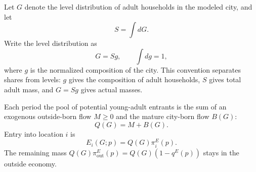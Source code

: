 \documentclass[11pt]{article}
\begin{document}
Let $G$ denote the level distribution of adult households in the modeled city, and let
\begin{equation*}
    S=\int dG.
\end{equation*}
Write the level distribution as
\begin{equation*}
    G=Sg,
    \qquad
    \int dg=1,
\end{equation*}
where $g$ is the normalized composition of the city. This convention separates shares from levels: $g$ gives the composition of adult households, $S$ gives total adult mass, and $G=Sg$ gives actual masses.

Each period the pool of potential young-adult entrants is the sum of an exogenous outside-born flow $M\geq0$ and the mature city-born flow $B(G)$:
\begin{equation}
    Q(G)=M+B(G).
    \label{eq:potential_entry_pool}
\end{equation}
Entry into location $i$ is
\begin{equation}
    E_i(G;p)=Q(G)\pi_i^E(p).
    \label{eq:entry_mass}
\end{equation}
The remaining mass $Q(G)\pi_{\mathrm{out}}^E(p)=Q(G)(1-q^E(p))$ stays in the outside economy.
\end{document}
